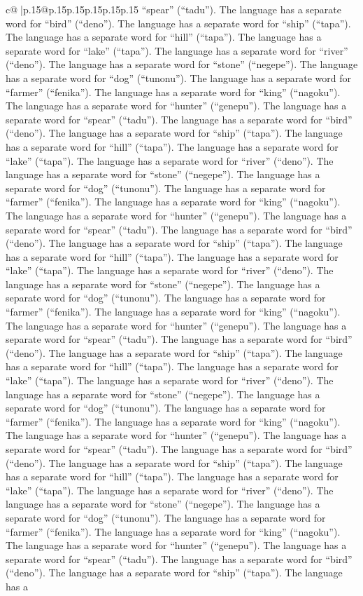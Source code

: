 \documentclass{article}
\begin{document}
{\begin{supertabular}{c@{$\;$}|p{.15\linewidth}@{}p{.15\linewidth}p{.15\linewidth}p{.15\linewidth}p{.15\linewidth}p{.15\linewidth}}
{{{“spear” (“tadu”). The language has a separate word for “bird” (“deno”). The language has a separate word for “ship” (“tapa”). The language has a separate word for “hill” (“tapa”). The language has a separate word for “lake” (“tapa”). The language has a separate word for “river” (“deno”). The language has a separate word for “stone” (“negepe”). The language has a separate word for “dog” (“tunonu”). The language has a separate word for “farmer” (“fenika”). The language has a separate word for “king” (“nagoku”). The language has a separate word for “hunter” (“genepu”). The language has a separate word for “spear” (“tadu”). The language has a separate word for “bird” (“deno”). The language has a separate word for “ship” (“tapa”). The language has a separate word for “hill” (“tapa”). The language has a separate word for “lake” (“tapa”). The language has a separate word for “river” (“deno”). The language has a separate word for “stone” (“negepe”). The language has a separate word for “dog” (“tunonu”). The language has a separate word for “farmer” (“fenika”). The language has a separate word for “king” (“nagoku”). The language has a separate word for “hunter” (“genepu”). The language has a separate word for “spear” (“tadu”). The language has a separate word for “bird” (“deno”). The language has a separate word for “ship” (“tapa”). The language has a separate word for “hill” (“tapa”). The language has a separate word for “lake” (“tapa”). The language has a separate word for “river” (“deno”). The language has a separate word for “stone” (“negepe”). The language has a separate word for “dog” (“tunonu”). The language has a separate word for “farmer” (“fenika”). The language has a separate word for “king” (“nagoku”). The language has a separate word for “hunter” (“genepu”). The language has a separate word for “spear” (“tadu”). The language has a separate word for “bird” (“deno”). The language has a separate word for “ship” (“tapa”). The language has a separate word for “hill” (“tapa”). The language has a separate word for “lake” (“tapa”). The language has a separate word for “river” (“deno”). The language has a separate word for “stone” (“negepe”). The language has a separate word for “dog” (“tunonu”). The language has a separate word for “farmer” (“fenika”). The language has a separate word for “king” (“nagoku”). The language has a separate word for “hunter” (“genepu”). The language has a separate word for “spear” (“tadu”). The language has a separate word for “bird” (“deno”). The language has a separate word for “ship” (“tapa”). The language has a separate word for “hill” (“tapa”). The language has a separate word for “lake” (“tapa”). The language has a separate word for “river” (“deno”). The language has a separate word for “stone” (“negepe”). The language has a separate word for “dog” (“tunonu”). The language has a separate word for “farmer” (“fenika”). The language has a separate word for “king” (“nagoku”). The language has a separate word for “hunter” (“genepu”). The language has a separate word for “spear” (“tadu”). The language has a separate word for “bird” (“deno”). The language has a separate word for “ship” (“tapa”). The language has a }}}
\end{supertabular}}
\end{document}
